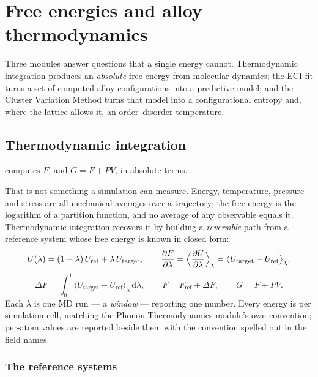 \chapter{Free energies and alloy thermodynamics}
\label{ch:freeenergy}

Three modules answer questions that a single energy cannot. Thermodynamic
integration produces an \emph{absolute} free energy from molecular dynamics;
the ECI fit turns a set of computed alloy configurations into a predictive
model; and the Cluster Variation Method turns that model into a configurational
entropy and, where the lattice allows it, an order--disorder temperature.

\section{Thermodynamic integration}
\label{sec:ti}

\menusep{} computes $F$, and
$G = F + PV$, in absolute terms.

That is not something a simulation can measure. Energy, temperature, pressure
and stress are all mechanical averages over a trajectory; the free energy is the
logarithm of a partition function, and no average of any observable equals it.
Thermodynamic integration recovers it by building a \emph{reversible} path from
a reference system whose free energy is known in closed form:
\begin{equation}
  U(\lambda) = (1-\lambda)\,U_\mathrm{ref} + \lambda\,U_\mathrm{target},
  \qquad
  \frac{\partial F}{\partial\lambda}
    = \Bigl\langle \frac{\partial U}{\partial\lambda} \Bigr\rangle_\lambda
    = \bigl\langle U_\mathrm{target} - U_\mathrm{ref} \bigr\rangle_\lambda ,
  \label{eq:ti-coupling}
\end{equation}
\begin{equation}
  \Delta F = \int_0^1
    \bigl\langle U_\mathrm{target} - U_\mathrm{ref} \bigr\rangle_\lambda
    \,\mathrm{d}\lambda ,
  \qquad
  F = F_\mathrm{ref} + \Delta F ,
  \qquad
  G = F + PV .
  \label{eq:ti-integral}
\end{equation}
Each $\lambda$ is one MD run --- a \emph{window} --- reporting one number. Every
energy is per simulation cell, matching the Phonon Thermodynamics module's own
convention; per-atom values are reported beside them with the convention
spelled out in the field names.

\subsection{The reference systems}

